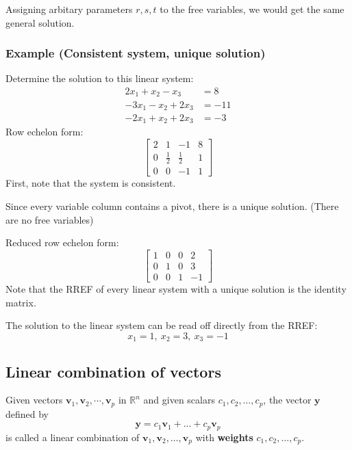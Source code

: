 \documentclass[../linear-algebra.tex]{subfiles}
\begin{document}
\noindent Assigning arbitary parameters $r,s,t$ to the free variables, we would get
the same general solution.

\subsubsection{Example (Consistent system, unique solution)}
Determine the solution to this linear system:
\begin{align*}
    2x_1 + x_2 - x_3 &= 8 \\
    -3x_1 - x_2 + 2x_3 &= -11 \\
    -2x_1 + x_2 + 2x_3 &= -3
\end{align*}
\noindent Row echelon form:
\[
\left[
\begin{array}{ccc|c}
    2 & 1 & -1 & 8 \\
    0 & \frac{1}{2} & \frac{1}{2} & 1 \\
    0 & 0 & -1 & 1
\end{array}
\right]
\]
\noindent First, note that the system is consistent.

\noindent Since every variable column contains a pivot,
there is a unique solution. (There are no free variables)

\medskip

\noindent Reduced row echelon form:
\[
\left[
\begin{array}{ccc|c}
    1 & 0 & 0 & 2 \\
    0 & 1 & 0 & 3 \\
    0 & 0 & 1 & -1
\end{array}
\right]
\]
\noindent Note that the RREF of every linear system with a unique solution
is the identity matrix.

\noindent The solution to the linear system can be read off directly from the RREF:
\[x_1=1,\:x_2=3,\:x_3=-1\]

\subsection{Linear combination of vectors}
\noindent Given vectors $\mathbf{v}_1, \mathbf{v}_2, \cdots, \mathbf{v}_p$ in $\mathbb{R}^n$ and given scalars $c_1, c_2, \dots, c_p$, the vector $\mathbf{y}$ defined by
\[
\mathbf{y} = c_1\mathbf{v}_1 + \dots + c_p\mathbf{v}_p
\]
is called a linear combination of $\mathbf{v}_1, \mathbf{v}_2, \dots, \mathbf{v}_p$ with \textbf{weights} $c_1, c_2, \dots, c_p$.
\end{document}
